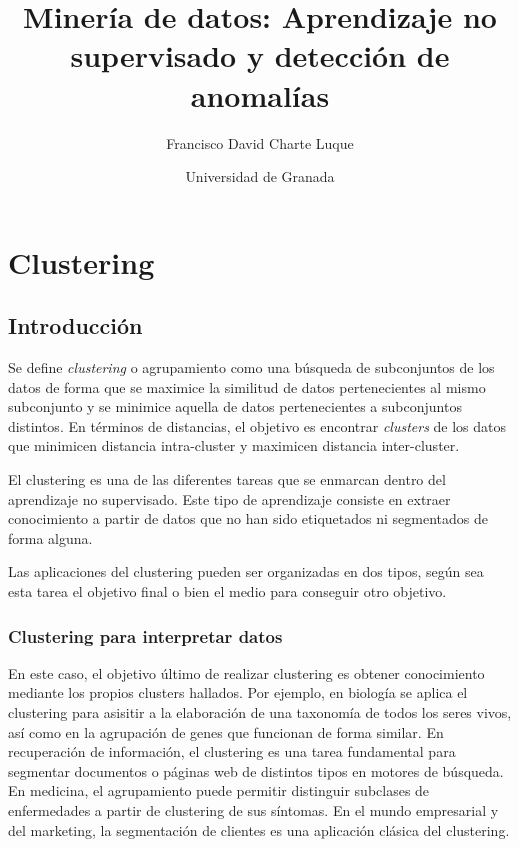 \documentclass[a4paper,11pt,spanish]{report}
\author{Francisco David Charte Luque}
\date{Universidad de Granada}
\title{Minería de datos: Aprendizaje no supervisado y detección de anomalías}
\let\stdchapter\chapter
\let\stdsection\section
\let\stdsub\subsection
\let\stdsubsub\subsubsection
\renewcommand{\part}{\stdchapter}
\renewcommand{\chapter}{\stdsection}
\renewcommand{\section}{\stdsub}
\renewcommand{\subsection}{\stdsubsub}
\begin{document}
\maketitle
\tableofcontents

\part{Clustering}
\label{sec-1}

\chapter{Introducción}
\label{sec-1-1}

Se define \emph{clustering} o agrupamiento como una búsqueda de subconjuntos de los datos de forma que se maximice la similitud de datos pertenecientes al mismo subconjunto y se minimice aquella de datos pertenecientes a subconjuntos distintos. En términos de distancias, el objetivo es encontrar \emph{clusters} de los datos que minimicen distancia intra-cluster y maximicen distancia inter-cluster.

El clustering es una de las diferentes tareas que se enmarcan dentro del aprendizaje no supervisado. Este tipo de aprendizaje consiste en extraer conocimiento a partir de datos que no han sido etiquetados ni segmentados de forma alguna.

Las aplicaciones del clustering pueden ser organizadas en dos tipos, según sea esta tarea el objetivo final o bien el medio para conseguir otro objetivo.

\section{Clustering para interpretar datos}
\label{sec-1-1-1}

En este caso, el objetivo último de realizar clustering es obtener conocimiento mediante los propios clusters hallados. Por ejemplo, en biología se aplica el clustering para asisitir a la elaboración de una taxonomía de todos los seres vivos, así como en la agrupación de genes que funcionan de forma similar. En recuperación de información, el clustering es una tarea fundamental para segmentar documentos o páginas web de distintos tipos en motores de búsqueda. En medicina, el agrupamiento puede permitir distinguir subclases de enfermedades a partir de clustering de sus síntomas. En el mundo empresarial y del marketing, la segmentación de clientes es una aplicación clásica del clustering.
\end{document}
